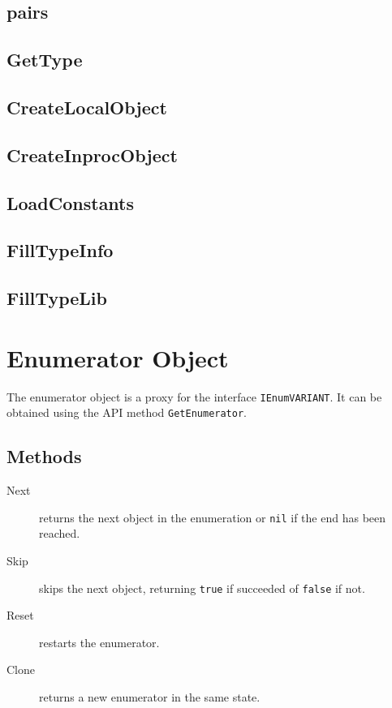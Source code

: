 \documentclass[11pt,a4paper,english]{report}
\newcommand{\ident}[1]{\mbox{\texttt{#1}}}
\begin{document}
\subsection*{pairs}

\subsection*{GetType}

\subsection*{CreateLocalObject}

\subsection*{CreateInprocObject}

\subsection*{LoadConstants}

\subsection*{FillTypeInfo}

\subsection*{FillTypeLib}

\section{Enumerator Object}
\label{sec:enumerator-object}

The enumerator object is a proxy for the interface
\ident{IEnumVARIANT}. It can be obtained using the API method
\ident{GetEnumerator}.

\subsection*{Methods}

\begin{description}

\item[Next] returns the next object in the enumeration or \ident{nil}
if the end has been reached.

\item[Skip] skips the next object, returning \ident{true} if succeeded
of \ident{false} if not.

\item[Reset] restarts the enumerator.

\item[Clone] returns a new enumerator in the same state.

\end{description}
\end{document}
